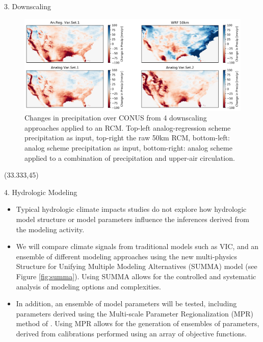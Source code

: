 \documentclass{beamer}
\begin{document}
\begin{frame}{}
\begin{columns}
\begin{column}{.3333\paperwidth}
\begin{textblock}{\textwidth \TPHorizModule}
\begin{block}{3. Downscaling}
\begin{itemize}
     \end{itemize}

     \vspace{-0.5cm}
     \begin{figure}
      \center\includegraphics[width=0.85\linewidth]{figures/deltas.png}
      \caption{Changes in precipitation over CONUS from 4 downscaling approaches applied to an RCM. Top-left analog-regression scheme precipitation as input, top-right the raw 50km RCM, bottom-left: analog scheme precipitation as input, bottom-right: analog scheme applied to a combination of precipitation and upper-air circulation.}
      \label{fig:downscaling}
     \end{figure}

    \end{block}

   \end{textblock}



   \begin{textblock}{\textwidth \TPHorizModule}(33.333,45)
    \begin{block}{4. Hydrologic Modeling}

        \begin{itemize}
         \justifying
         \item Typical hydrologic climate impacts studies do not explore how hydrologic model structure or model parameters influence the inferences derived from the modeling activity.
         \item We will compare climate signals from traditional models such as VIC, and an ensemble of different modeling approaches using the new multi-physics Structure for Unifying Multiple Modeling Alternatives (SUMMA) model \citep{Clark_2015} (see Figure \ref{fig:summa}). Using SUMMA allows for the controlled and systematic analysis of modeling options and complexities.
         \item In addition, an ensemble of model parameters will be tested, including parameters derived using the Multi-scale Parameter Regionalization (MPR) method of \citet{Samaniego_2010}. Using MPR allows for the generation of ensembles of parameters, derived from calibrations performed using an array of objective functions.
        \end{itemize}


\end{block}
\end{textblock}
\end{column}
\end{columns}
\end{frame}
\end{document}
